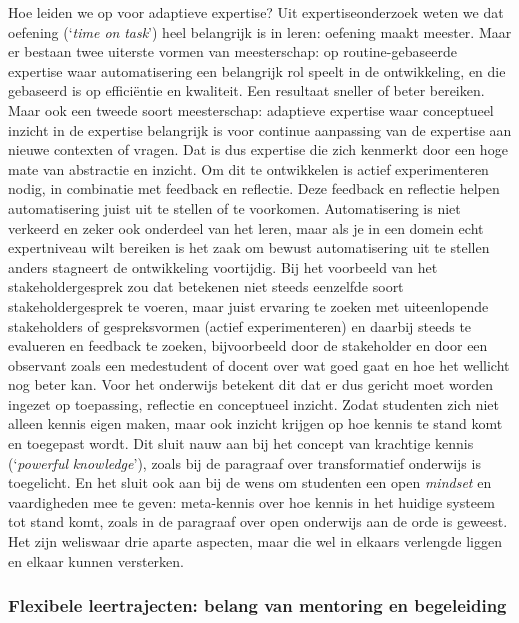 \documentclass[smallauthor, chapterhaspagenum, nochapterinheader, pagenuminheader,  bigchapnum,medium2, tocpages,  garamond, titleinheader]{jote-book}
\begin{document}
	Hoe leiden we op voor adaptieve expertise? Uit expertiseonderzoek weten we dat oefening (‘\emph{time on }\emph{task}') heel belangrijk is in leren: oefening maakt meester. Maar er bestaan twee uiterste vormen van meesterschap: op routine-gebaseerde expertise waar automatisering een belangrijk rol speelt in de ontwikkeling, en die gebaseerd is op efficiëntie en kwaliteit. Een resultaat sneller of beter bereiken. Maar ook een tweede soort meesterschap: adaptieve expertise waar conceptueel inzicht in de expertise belangrijk is voor continue aanpassing van de expertise aan nieuwe contexten of vragen. Dat is dus expertise die zich kenmerkt door een hoge mate van abstractie en inzicht. Om dit te ontwikkelen is actief experimenteren nodig, in combinatie met feedback en reflectie. Deze feedback en reflectie helpen automatisering juist uit te stellen of te voorkomen. Automatisering is niet verkeerd en zeker ook onderdeel van het leren, maar als je in een domein echt expertniveau wilt bereiken is het zaak om bewust automatisering uit te stellen anders stagneert de ontwikkeling voortijdig. Bij het voorbeeld van het stakeholdergesprek zou dat betekenen niet steeds eenzelfde soort stakeholdergesprek te voeren, maar juist ervaring te zoeken met uiteenlopende stakeholders of gespreksvormen (actief experimenteren) en daarbij steeds te evalueren en feedback te zoeken, bijvoorbeeld door de stakeholder en door een observant zoals een medestudent of docent over wat goed gaat en hoe het wellicht nog beter kan. Voor het onderwijs betekent dit dat er dus gericht moet worden ingezet op toepassing, reflectie en conceptueel inzicht. Zodat studenten zich niet alleen kennis eigen maken, maar ook inzicht krijgen op hoe kennis te stand komt en toegepast wordt. Dit sluit nauw aan bij het concept van krachtige kennis (‘\emph{powerful}\emph{ }\emph{knowledge}'), zoals bij de paragraaf over transformatief onderwijs is toegelicht. En het sluit ook aan bij de wens om studenten een open \emph{mindset} en vaardigheden mee te geven: meta-kennis over hoe kennis in het huidige systeem tot stand komt, zoals in de paragraaf over open onderwijs aan de orde is geweest. Het zijn weliswaar drie aparte aspecten, maar die wel in elkaars verlengde liggen en elkaar kunnen versterken.



	\subsubsection{Flexibele leertrajecten: belang van mentoring en begeleiding}
\end{document}
